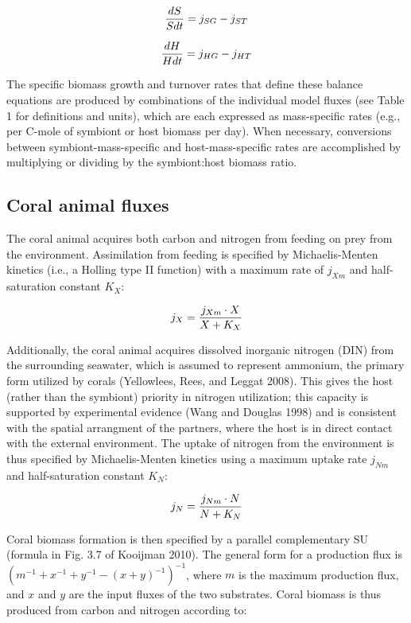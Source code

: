 \documentclass[]{elsarticle} %
\begin{document}
\begin{equation} {dS \over Sdt} = j_{SG} - j_{ST} \end{equation}

\begin{equation} {dH \over Hdt} = j_{HG} - j_{HT} \end{equation}

The specific biomass growth and turnover rates that define these balance
equations are produced by combinations of the individual model fluxes
(see Table 1 for definitions and units), which are each expressed as
mass-specific rates (e.g., per C-mole of symbiont or host biomass per
day). When necessary, conversions between symbiont-mass-specific and
host-mass-specific rates are accomplished by multiplying or dividing by
the symbiont:host biomass ratio.

\subsection{Coral animal fluxes}\label{coral-animal-fluxes}

The coral animal acquires both carbon and nitrogen from feeding on prey
from the environment. Assimilation from feeding is specified by
Michaelis-Menten kinetics (i.e., a Holling type II function) with a
maximum rate of \(j_{Xm}\) and half-saturation constant \(K_X\):

\begin{equation} j_X = {{j_{Xm} \cdot X} \over {X + K_X}} \end{equation}

Additionally, the coral animal acquires dissolved inorganic nitrogen
(DIN) from the surrounding seawater, which is assumed to represent
ammonium, the primary form utilized by corals (Yellowlees, Rees, and
Leggat 2008). This gives the host (rather than the symbiont) priority in
nitrogen utilization; this capacity is supported by experimental
evidence (Wang and Douglas 1998) and is consistent with the spatial
arrangment of the partners, where the host is in direct contact with the
external environment. The uptake of nitrogen from the environment is
thus specified by Michaelis-Menten kinetics using a maximum uptake rate
\(j_{Nm}\) and half-saturation constant \(K_N\):

\begin{equation} j_N = {{j_{Nm} \cdot N} \over {N + K_N}} \end{equation}

Coral biomass formation is then specified by a parallel complementary SU
(formula in Fig. 3.7 of Kooijman 2010). The general form for a
production flux is \((m^{-1} + x^{-1} + y^{-1} - (x + y)^{-1})^{-1}\),
where \(m\) is the maximum production flux, and \(x\) and \(y\) are the
input fluxes of the two substrates. Coral biomass is thus produced from
carbon and nitrogen according to:
\end{document}
